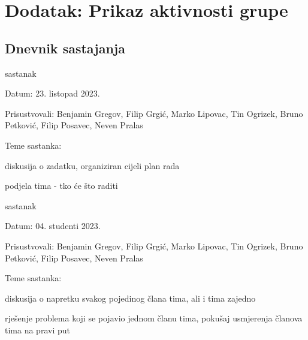 \chapter*{Dodatak: Prikaz aktivnosti grupe}
		
		\section*{Dnevnik sastajanja}
		
		\begin{packed_enum}
			\item  sastanak
			
			\item[] \begin{packed_item}
				\item Datum: 23. listopad 2023.
				\item Prisustvovali: Benjamin Gregov, Filip Grgić, Marko Lipovac, Tin Ogrizek, Bruno Petković, Filip Posavec, Neven Pralas
				\item Teme sastanka:
				\begin{packed_item}
					\item  diskusija o zadatku, organiziran cijeli plan rada
					\item  podjela tima - tko će što raditi
				\end{packed_item}
			\end{packed_item}
			
			\item  sastanak
			\item[] \begin{packed_item}
				\item Datum: 04. studenti 2023.
				\item Prisustvovali: Benjamin Gregov, Filip Grgić, Marko Lipovac, Tin Ogrizek, Bruno Petković, Filip Posavec, Neven Pralas
				\item Teme sastanka:
				\begin{packed_item}
					\item  diskusija o napretku svakog pojedinog člana tima, ali i tima zajedno
					\item  rješenje problema koji se pojavio jednom članu tima, pokušaj usmjerenja članova tima na pravi put
				\end{packed_item}
			\end{packed_item}
			

\end{packed_enum}
